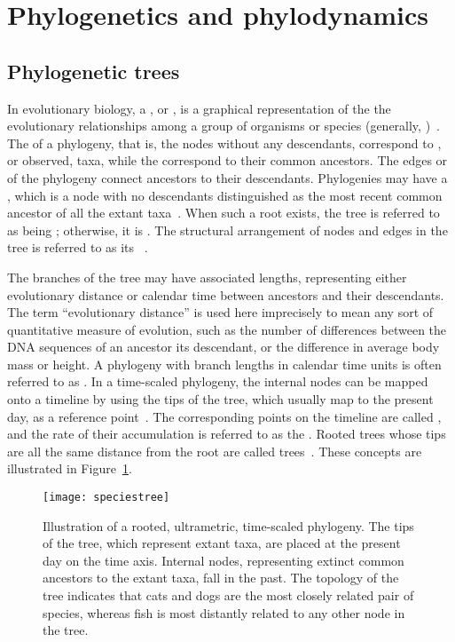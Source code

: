 \section{Phylogenetics and phylodynamics}

\subsection{Phylogenetic trees}

In evolutionary biology, a , or , is a
graphical representation of the the evolutionary relationships among a group of
organisms or species (generally, )~\autocite{haeckel1866generelle}.
The  of a phylogeny, that is, the nodes without any descendants,
correspond to , or observed, taxa, while the 
correspond to their common ancestors. The edges or  of the
phylogeny connect ancestors to their descendants. Phylogenies may have a
, which is a node with no descendants distinguished as the most
recent common ancestor of all the extant
taxa~\autocite{harding1971probabilities}. When such a root exists, the tree is
referred to as being ; otherwise, it is . The
structural arrangement of nodes and edges in the tree is referred to as its
~\autocite{cavalli1967phylogenetic}. 

The branches of the tree may have associated lengths, representing either
evolutionary distance or calendar time between ancestors and their descendants.
The term ``evolutionary distance'' is used here imprecisely to mean any sort of
quantitative measure of evolution, such as the number of differences between
the DNA sequences of an ancestor its descendant, or the difference in average
body mass or height. A phylogeny with branch lengths in calendar time units is
often referred to as . In a time-scaled phylogeny, the
internal nodes can be mapped onto a timeline by using the tips of the tree,
which usually map to the present day, as a reference
point~\autocite{nee1992tempo}. The corresponding points on the timeline are
called , and the rate of their accumulation is referred
to as the . Rooted trees whose tips are all the same
distance from the root are called 
trees~\autocite{buneman1974note}. These concepts are illustrated in
Figure~\ref{fig:speciestree}.

\begin{figure}[ht]
  \centering
  \label{fig:speciestree}
  \texttt{[image: speciestree]}
  \caption[Illustration of a rooted, ultrametric, time-scaled phylogeny]
    {Illustration of a rooted, ultrametric, time-scaled phylogeny. The tips of
      the tree, which represent extant taxa, are placed at the present day on
      the time axis. Internal nodes, representing extinct common ancestors to
      the extant taxa, fall in the past. The topology of the tree indicates
      that cats and dogs are the most closely related pair of species, whereas
      fish is most distantly related to any other node in the tree.}
\end{figure}


